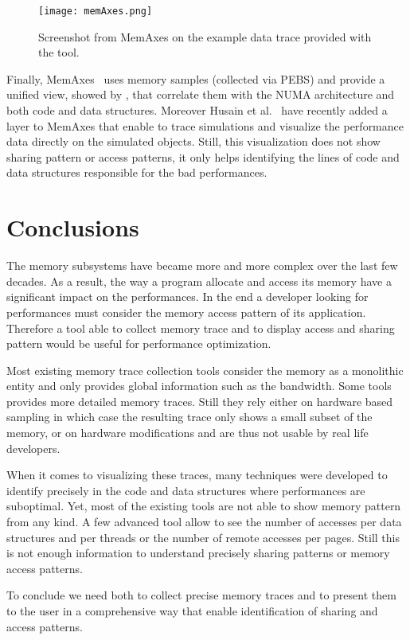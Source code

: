 \begin{figure}[htb]
    \centering
    \texttt{[image: memAxes.png]}
    \caption[Screenshot from MemAxes.]{Screenshot from MemAxes on the example data trace provided with the
    tool.}
    \label{fig:memaxes}
\end{figure}

Finally, \gls{MemAxes}~\cite{Gimenez14Dissecting} uses memory samples (collected via \gls{PEBS}) and provide a unified view, showed by , that correlate them with the \gls{NUMA} architecture and both code and data structures.
Moreover Husain et al.~\cite{Husain15Relating} have recently added a layer to \gls{MemAxes} that enable to trace simulations and visualize the performance data directly on the simulated objects.
Still, this visualization does not show sharing pattern or access patterns, it only helps identifying the lines of code and data structures responsible for the bad performances.

\section{Conclusions}
\label{sec:mem-cncl}

The memory subsystems have became more and more complex over the last few decades.
As a result, the way a program allocate and access its memory have a significant impact on the performances.
In the end a developer looking for performances must consider the memory access pattern of its application.
Therefore a tool able to collect memory trace and to display access and sharing pattern would be useful for performance optimization.

Most existing memory trace collection tools consider the memory as a monolithic entity and only provides global information such as the bandwidth.
Some tools provides more detailed memory traces.
Still they rely either on  hardware based sampling in which case the resulting trace only shows a small subset of the memory, or on hardware modifications and are thus not usable by real life developers.

When it comes to visualizing these traces, many techniques were developed to identify precisely in the code and data structures where performances are suboptimal.
Yet, most of the existing tools are not able to show memory pattern from any kind.
A few advanced tool allow to see the number of accesses per data structures and per threads or the number of remote accesses per pages.
Still this is not enough information to understand precisely sharing patterns or memory access patterns.

To conclude we need both to collect precise memory traces and to present them to the user in a comprehensive way that enable identification of sharing and access patterns.
